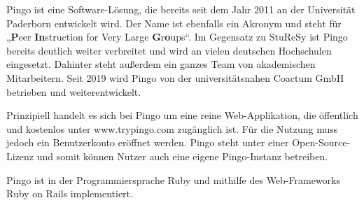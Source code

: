 Pingo ist eine Software-Lösung, die bereits seit dem Jahr 2011 an der Universität Paderborn entwickelt wird. Der Name ist ebenfalls ein Akronym und steht für „\textbf{P}eer \textbf{In}struction for Very Large \textbf{G}r\textbf{o}ups“. Im Gegensatz zu StuReSy ist Pingo bereits deutlich weiter verbreitet und wird an vielen deutschen Hochschulen eingesetzt. Dahinter steht außerdem ein ganzes Team von akademischen Mitarbeitern. Seit 2019 wird Pingo von der universitätsnahen Coactum GmbH betrieben und weiterentwickelt.\newline

Prinzipiell handelt es sich bei Pingo um eine reine Web-Applikation, die öffentlich und kostenlos unter www.trypingo.com zugänglich ist. Für die Nutzung muss jedoch ein Benutzerkonto eröffnet werden. Pingo steht unter einer Open-Source-Lizenz und somit können Nutzer auch eine eigene Pingo-Instanz betreiben.

Pingo ist in der Programmiersprache Ruby und mithilfe des Web-Frameworks Ruby on Rails implementiert.